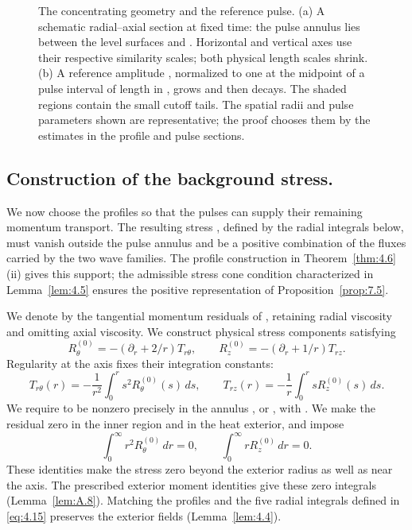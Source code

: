 %
\begin{figure}[htbp]
 \centering
 \caption{The concentrating geometry and the reference pulse. (a) A schematic radial--axial
 section at fixed time: the pulse annulus lies between the level surfaces
  and . Horizontal and vertical axes use their
 respective similarity scales; both physical length scales shrink. (b) A reference amplitude
 , normalized to one at the midpoint of a pulse interval of length
  in , grows and then decays. The shaded regions
 contain the small cutoff tails. The spatial radii and pulse parameters shown are representative;
 the proof chooses them by the estimates in the profile and pulse sections.}
 \label{fig:3}
\end{figure}

\subsection{Construction of the background stress.}\label{sec:3.2}
We now choose the profiles  so that the pulses can supply their remaining
momentum transport. The resulting stress , defined by the radial integrals
below, must vanish outside the pulse annulus and be a positive combination of the fluxes carried
by the two wave families. The profile construction in Theorem~\ref{thm:4.6}(ii) gives this support;
the admissible stress cone condition characterized in Lemma~\ref{lem:4.5} ensures the positive
representation of Proposition~\ref{prop:7.5}.

We denote by  the tangential momentum residuals of
, retaining radial viscosity and omitting axial viscosity.
We construct physical stress components
 satisfying
\[
 R_\theta^{(0)}=-(\partial_r+2/r)T_{r\theta},
 \qquad
 R_z^{(0)}=-(\partial_r+1/r)T_{rz}.
\]
Regularity at the axis fixes their integration constants:
\[
 T_{r\theta}(r)=-\frac1{r^2}\int_0^r s^2R_\theta^{(0)}(s)\,ds,
 \qquad
 T_{rz}(r)=-\frac1r\int_0^r sR_z^{(0)}(s)\,ds.
\]
We require  to be nonzero precisely in the annulus
, or
, with
. We make the residual zero in the inner region and in the heat
exterior, and impose
\[
 \int_0^\infty r^2R_\theta^{(0)}\,dr=0,
 \qquad
 \int_0^\infty rR_z^{(0)}\,dr=0.
\]
These identities make the stress zero beyond the exterior radius as well as near the axis. The
prescribed exterior moment identities give these zero integrals (Lemma~\ref{lem:A.8}). Matching
the profiles and the five radial integrals defined in \eqref{eq:4.15} preserves the exterior fields
(Lemma~\ref{lem:4.4}).

